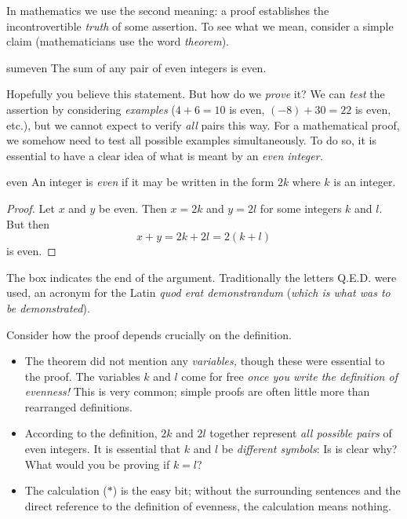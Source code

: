 In mathematics we use the second meaning: a proof establishes the incontrovertible \emph{truth} of some assertion. To see what we mean, consider a simple claim (mathematicians use the word \emph{theorem}).

\begin{thm}{}{sumeven}
	The sum of any pair of even integers is even.
\end{thm}

Hopefully you believe this statement. But how do we \emph{prove} it? We can \emph{test} the assertion by considering \emph{examples} ($4+6=10$ is even, $(-8)+30=22$ is even, etc.), but we cannot expect to verify \emph{all} pairs this way. For a mathematical proof, we somehow need to test all possible examples simultaneously. To do so, it is essential to have a clear idea of what is meant by an \emph{even integer.}

\begin{defn}{}{even}
	An integer is \emph{even} if it may be written in the form $2k$ where $k$ is an integer.
\end{defn}

\begin{proof}
	Let $x$ and $y$ be even. Then $x=2k$ and $y=2l$ for some integers $k$ and $l$. But then
	\[
		x+y=2k+2l=2(k+l)\tag{$\ast$}
	\]
	is even.
\end{proof}

The box \smash{\raisebox{8pt}{$\qedsymbol$}} indicates the end of the argument. Traditionally the letters Q.E.D.{} were used, an acronym for the Latin \emph{quod erat demonstrandum} (\emph{which is what was to be demonstrated}).
\smallbreak

Consider how the proof depends crucially on the definition.

\begin{itemize}\itemsep0pt
	\item The theorem did not mention any \emph{variables,} though these were essential to the proof. The variables $k$ and $l$ come for free \emph{once you write the definition of evenness!} This is very common; simple proofs are often little more than rearranged definitions.
	\item According to the definition, $2k$ and $2l$ together represent \emph{all possible pairs} of even integers. It is essential that $k$ and $l$ be \emph{different symbols}: Is is clear why? What would you be proving if $k=l$?
	\item The calculation ($\ast$) is the easy bit; without the surrounding sentences and the direct reference to the definition of evenness, the calculation means nothing.
\end{itemize}

